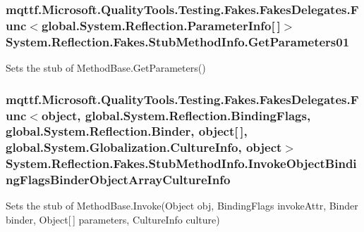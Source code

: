 \hypertarget{class_system_1_1_reflection_1_1_fakes_1_1_stub_method_info_abbfb01cb3e7e875b3157caa46a2f4512}{
\subsubsection[{Get\-Parameters01}]{\setlength{\rightskip}{0pt plus 5cm}mqttf.\-Microsoft.\-Quality\-Tools.\-Testing.\-Fakes.\-Fakes\-Delegates.\-Func$<$global.\-System.\-Reflection.\-Parameter\-Info\mbox{[}$\,$\mbox{]}$>$ System.\-Reflection.\-Fakes.\-Stub\-Method\-Info.\-Get\-Parameters01}}\label{class_system_1_1_reflection_1_1_fakes_1_1_stub_method_info_abbfb01cb3e7e875b3157caa46a2f4512}


Sets the stub of Method\-Base.\-Get\-Parameters()

\hypertarget{class_system_1_1_reflection_1_1_fakes_1_1_stub_method_info_a0a9db65c0802419fdf5cc3586e4a0720}{
\subsubsection[{Invoke\-Object\-Binding\-Flags\-Binder\-Object\-Array\-Culture\-Info}]{\setlength{\rightskip}{0pt plus 5cm}mqttf.\-Microsoft.\-Quality\-Tools.\-Testing.\-Fakes.\-Fakes\-Delegates.\-Func$<$object, global.\-System.\-Reflection.\-Binding\-Flags, global.\-System.\-Reflection.\-Binder, object\mbox{[}$\,$\mbox{]}, global.\-System.\-Globalization.\-Culture\-Info, object$>$ System.\-Reflection.\-Fakes.\-Stub\-Method\-Info.\-Invoke\-Object\-Binding\-Flags\-Binder\-Object\-Array\-Culture\-Info}}\label{class_system_1_1_reflection_1_1_fakes_1_1_stub_method_info_a0a9db65c0802419fdf5cc3586e4a0720}


Sets the stub of Method\-Base.\-Invoke(\-Object obj, Binding\-Flags invoke\-Attr, Binder binder, Object\mbox{[}$\,$\mbox{]} parameters, Culture\-Info culture)

